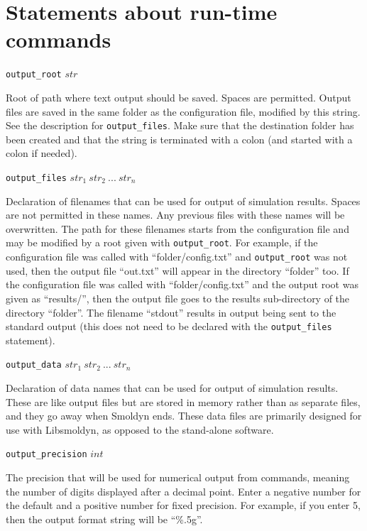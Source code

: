 \documentclass {book}
\newcommand {\ttt} {\texttt}
\begin{document}
\section{Statements about run-time commands}

\begin{description}

\item{\ttt{output\_root} $str$}

Root of path where text output should be saved. Spaces are permitted. Output files are saved in the same folder as the configuration file, modified by this string. See the description for \ttt{output\_files}. Make sure that the destination folder has been created and that the string is terminated with a colon (and started with a colon if needed).

\item{\ttt{output\_files} $str_1\ str_2\ ...\ str_n$}

Declaration of filenames that can be used for output of simulation results. Spaces are not permitted in these names. Any previous files with these names will be overwritten. The path for these filenames starts from the configuration file and may be modified by a root given with \ttt{output\_root}. For example, if the configuration file was called with ``folder/config.txt'' and \ttt{output\_root} was not used, then the output file ``out.txt'' will appear in the directory ``folder'' too. If the configuration file was called with ``folder/config.txt'' and the output root was given as ``results/'', then the output file goes to the results sub-directory of the directory ``folder''. The filename ``stdout'' results in output being sent to the standard output (this does not need to be declared with the \ttt{output\_files} statement).

\item{\ttt{output\_data} $str_1\ str_2\ ...\ str_n$}

Declaration of data names that can be used for output of simulation results. These are like output files but are stored in memory rather than as separate files, and they go away when Smoldyn ends. These data files are primarily designed for use with Libsmoldyn, as opposed to the stand-alone software.

\item{\ttt{output\_precision} $int$}

The precision that will be used for numerical output from commands, meaning the number of digits displayed after a decimal point. Enter a negative number for the default and a positive number for fixed precision. For example, if you enter 5, then the output format string will be ``\%.5g''.


\end{description}
\end{document}
